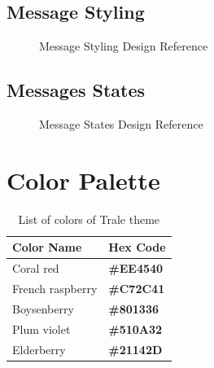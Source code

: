 \subsection{Message Styling}\label{subsec:message-styling}

\begin{figure}[ht]
    \caption{Message Styling Design Reference}
    \centering\def\svgwidth{15cm}\label{fig:figure2}
\end{figure}

\subsection{Messages States}\label{subsec:messages-states}
\begin{figure}[ht]
    \caption{Message States Design Reference}
    \centering\def\svgwidth{15cm}\label{fig:figure3}
\end{figure}


\section{Color Palette}\label{sec:color-palette}

\begin{table}[hb]
    \centering
    \begin{tabular}{|l|l|}
        \hline
        \textbf{Color Name} & \textbf{Hex Code}                     \\ \hline
        Coral red           & \color[HTML]{EE4540}\textbf{\#EE4540} \\ \hline
        French raspberry    & \color[HTML]{C72C41}\textbf{\#C72C41} \\ \hline
        Boysenberry         & \color[HTML]{801336}\textbf{\#801336} \\ \hline
        Plum violet         & \color[HTML]{510A32}\textbf{\#510A32} \\ \hline
        Elderberry          & \color[HTML]{21142D}\textbf{\#21142D} \\ \hline
    \end{tabular}
    \caption{List of colors of Trale theme}
    \label{tab:colorTable}
\end{table}

